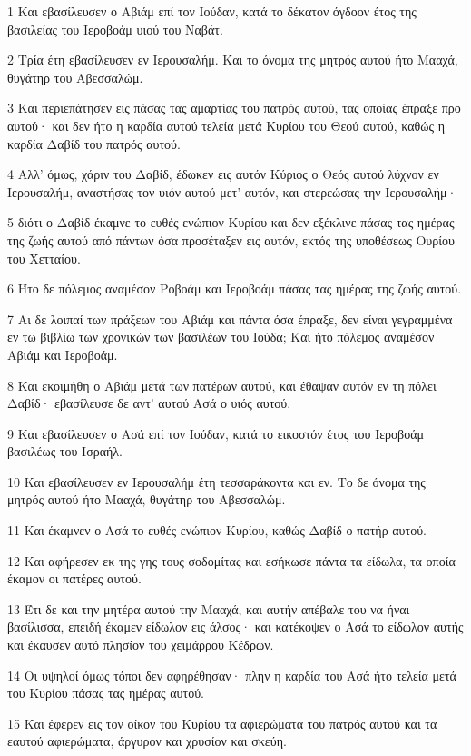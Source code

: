 \par 1 Και εβασίλευσεν ο Αβιάμ επί τον Ιούδαν, κατά το δέκατον όγδοον έτος της βασιλείας του Ιεροβοάμ υιού του Ναβάτ.
\par 2 Τρία έτη εβασίλευσεν εν Ιερουσαλήμ. Και το όνομα της μητρός αυτού ήτο Μααχά, θυγάτηρ του Αβεσσαλώμ.
\par 3 Και περιεπάτησεν εις πάσας τας αμαρτίας του πατρός αυτού, τας οποίας έπραξε προ αυτού· και δεν ήτο η καρδία αυτού τελεία μετά Κυρίου του Θεού αυτού, καθώς η καρδία Δαβίδ του πατρός αυτού.
\par 4 Αλλ' όμως, χάριν του Δαβίδ, έδωκεν εις αυτόν Κύριος ο Θεός αυτού λύχνον εν Ιερουσαλήμ, αναστήσας τον υιόν αυτού μετ' αυτόν, και στερεώσας την Ιερουσαλήμ·
\par 5 διότι ο Δαβίδ έκαμνε το ευθές ενώπιον Κυρίου και δεν εξέκλινε πάσας τας ημέρας της ζωής αυτού από πάντων όσα προσέταξεν εις αυτόν, εκτός της υποθέσεως Ουρίου του Χετταίου.
\par 6 Ήτο δε πόλεμος αναμέσον Ροβοάμ και Ιεροβοάμ πάσας τας ημέρας της ζωής αυτού.
\par 7 Αι δε λοιπαί των πράξεων του Αβιάμ και πάντα όσα έπραξε, δεν είναι γεγραμμένα εν τω βιβλίω των χρονικών των βασιλέων του Ιούδα; Και ήτο πόλεμος αναμέσον Αβιάμ και Ιεροβοάμ.
\par 8 Και εκοιμήθη ο Αβιάμ μετά των πατέρων αυτού, και έθαψαν αυτόν εν τη πόλει Δαβίδ· εβασίλευσε δε αντ' αυτού Ασά ο υιός αυτού.
\par 9 Και εβασίλευσεν ο Ασά επί τον Ιούδαν, κατά το εικοστόν έτος του Ιεροβοάμ βασιλέως του Ισραήλ.
\par 10 Και εβασίλευσεν εν Ιερουσαλήμ έτη τεσσαράκοντα και εν. Το δε όνομα της μητρός αυτού ήτο Μααχά, θυγάτηρ του Αβεσσαλώμ.
\par 11 Και έκαμνεν ο Ασά το ευθές ενώπιον Κυρίου, καθώς Δαβίδ ο πατήρ αυτού.
\par 12 Και αφήρεσεν εκ της γης τους σοδομίτας και εσήκωσε πάντα τα είδωλα, τα οποία έκαμον οι πατέρες αυτού.
\par 13 Έτι δε και την μητέρα αυτού την Μααχά, και αυτήν απέβαλε του να ήναι βασίλισσα, επειδή έκαμεν είδωλον εις άλσος· και κατέκοψεν ο Ασά το είδωλον αυτής και έκαυσεν αυτό πλησίον του χειμάρρου Κέδρων.
\par 14 Οι υψηλοί όμως τόποι δεν αφηρέθησαν· πλην η καρδία του Ασά ήτο τελεία μετά του Κυρίου πάσας τας ημέρας αυτού.
\par 15 Και έφερεν εις τον οίκον του Κυρίου τα αφιερώματα του πατρός αυτού και τα εαυτού αφιερώματα, άργυρον και χρυσίον και σκεύη.
